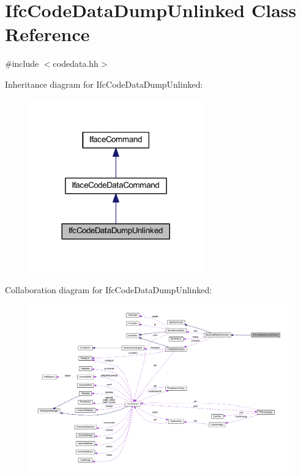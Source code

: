 \hypertarget{class_ifc_code_data_dump_unlinked}{}\section{Ifc\+Code\+Data\+Dump\+Unlinked Class Reference}
\label{class_ifc_code_data_dump_unlinked}


{\ttfamily \#include $<$codedata.\+hh$>$}



Inheritance diagram for Ifc\+Code\+Data\+Dump\+Unlinked\+:
\nopagebreak
\begin{figure}[H]
\begin{center}
\leavevmode
\includegraphics[width=212pt]{class_ifc_code_data_dump_unlinked__inherit__graph}
\end{center}
\end{figure}


Collaboration diagram for Ifc\+Code\+Data\+Dump\+Unlinked\+:
\nopagebreak
\begin{figure}[H]
\begin{center}
\leavevmode
\includegraphics[width=350pt]{class_ifc_code_data_dump_unlinked__coll__graph}
\end{center}
\end{figure}
